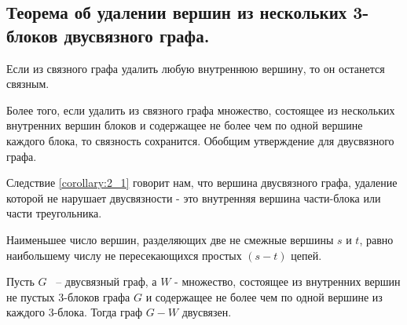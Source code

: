 \subsection{Теорема об удалении вершин из нескольких 3-блоков двусвязного графа.}

Если из связного графа удалить любую внутреннюю вершину, то он останется связным.

Более того, если удалить из связного графа множество, состоящее из нескольких внутренних вершин блоков и содержащее не более чем по одной вершине каждого блока, то связность сохранится.
Обобщим утверждение для двусвязного графа.

Следствие \ref{corollary:2_1} говорит нам, что вершина двусвязного графа, удаление которой не нарушает двусвязности - это внутренняя вершина части-блока или части треугольника.

\begin{remrk} \label{theorem:menger}
	Наименьшее число вершин, разделяющих две не смежные вершины $s$ и  $t$, равно наибольшему числу не пересекающихся простых $(s - t)$ цепей.
\end{remrk}

\begin{customthm}{2.4} \label{theorem:2_4}
	Пусть $G$ ~-- двусвязный граф, а $W$ - множество, состоящее из внутренних вершин не пустых 3-блоков графа  $G$ и содержащее не более чем по одной вершине из каждого 3-блока.
	Тогда граф  $G - W$ двусвязен.
\end{customthm}

